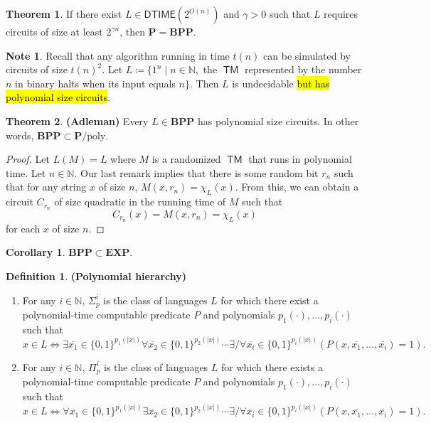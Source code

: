 \documentclass[10pt,letterpaper,cm]{nupset}
\theoremstyle{definition}
\newtheorem*{definition}{Definition}
\newtheorem{note}{Note}
\newtheorem{theorem}{Theorem}
\newtheorem{corollary}{Corollary}
\newcommand{\N}{\mathbb N}
\newcommand{\1}{\mathbf{1}}
\newcommand{\0}{\vec 0}
\DeclareMathOperator{\TM}{\mathsf{TM}}
\begin{document}
\begin{theorem}
If there exist $L \in \mathsf{DTIME}(2^{O(n)})$ and $\gamma >0$ such that $L$ requires circuits of size at least $2^{\gamma{n}}$, then $\mathbf{P} = \mathbf{BPP}$.
\end{theorem}

\begin{note}
Recall that any algorithm running in time $t(n)$ can be simulated by circuits of size $t(n)^2$. Let $L \coloneqq \{ 1^n \mid n \in \N,$ the $\TM$ represented by the number $n$ in binary halts when its input equals $n\}$. Then $L$ is undecidable \hl{but has polynomial size circuits}. 
\end{note}

\begin{theorem}{\textbf{(Adleman)}}
Every $L\in \mathbf{BPP}$ has polynomial size circuits. In other words, $\mathbf{BPP} \subset \mathbf{P}/\mathrm{poly}$.
\end{theorem}
\begin{proof}
Let $L(M)  = L$ where $M$ is a randomized $\TM$ that runs in polynomial time. Let $n\in \N$. Our last remark implies that there is some random bit $r_n$ such that for any string $x$ of size $n$, $M(x,r_n) = \chi_L(x)$. From this, we can obtain a circuit $C_{r_n}$ of size quadratic in the running time of $M$ such that $$C_{r_n}(x) = M(x,{r_n}) = \chi_L(x)$$ for each $x$ of size $n$.
\end{proof}

\begin{corollary}
$\mathbf{BPP} \subset \mathbf{EXP}$.
\end{corollary}

\begin{definition}{\textbf{(Polynomial hierarchy)}}
\begin{enumerate}
\item For any $i \in \N$, $\Sigma_p^i$ is the class of languages $L$ for which there exist a polynomial-time computable predicate $P$ and polynomials $p_1({\cdot}), \ldots, p_i({\cdot})$ such that $$x \in L \iff \exists \overline{x_1}\in \{0,1\}^{p_1(|x|)} \forall \overline{x_2} \in  \{0,1\}^{p_2(|x|)}\cdots \exists /\forall \overline{x_i}\in \{0,1\}^{p_i(|x|)}(P(x, \overline{x_1}, \ldots, \overline{x_i}) =1).$$  
\item For any $i \in \N$, $\Pi_p^i$ is the class of languages $L$ for which there exists a polynomial-time computable predicate $P$ and polynomials $p_1({\cdot}), \ldots, p_i({\cdot})$ such that $$x \in L \iff \forall \overline{x_1}\in \{0,1\}^{p_1(|x|)} \exists \overline{x_2} \in  \{0,1\}^{p_2(|x|)}\cdots \exists /\forall \overline{x_i}\in \{0,1\}^{p_i(|x|)}(P(x, \overline{x_1}, \ldots, \overline{x_i}) =1).$$  
\end{enumerate}
\end{definition}
\end{document}
